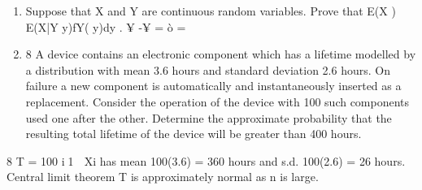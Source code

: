 \documentclass[a4paper,12pt]{article}
\begin{document}
\begin{enumerate}
\item Suppose that X and Y are continuous random variables.
Prove that E(X ) E(X|Y y)fY( y)dy .
¥
-¥
= ò = 
\newpage
\item 8 A device contains an electronic component which has a lifetime modelled by a
distribution with mean 3.6 hours and standard deviation 2.6 hours. On failure
a new component is automatically and instantaneously inserted as a
replacement.
Consider the operation of the device with 100 such components used one after
the other. Determine the approximate probability that the resulting total
lifetime of the device will be greater than 400 hours. 

\end{enumerate}
8 T =
100
i1
 Xi has mean 100(3.6) = 360 hours
and s.d. 100(2.6) = 26 hours.
Central limit theorem 
 T is approximately normal as n is large.
\end{document}
